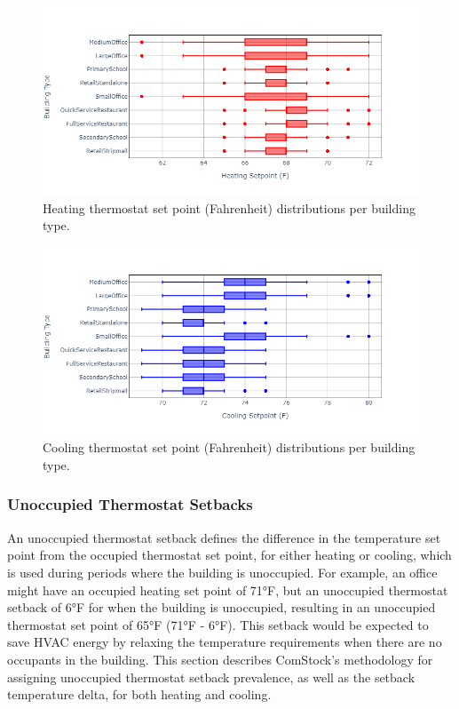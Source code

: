 

\begin{figure}
    \centering \includegraphics[width=1.0\textwidth]{figures/heating_setpoints.png}
    \caption{Heating thermostat set point (Fahrenheit) distributions per building type.}
    \label{fig:htg_therm_setpoints}
\end{figure}

\begin{figure}
    \centering \includegraphics[width=1.0\textwidth]{figures/cooling_setpoints.png}
    \caption{Cooling thermostat set point (Fahrenheit) distributions per building type.}
    \label{fig:clg_therm_setpoints}
\end{figure}

\pagebreak
\subsubsection{Unoccupied Thermostat Setbacks}

An unoccupied thermostat setback defines the difference in the temperature set point from the occupied thermostat set point, for either heating or cooling, which is used during periods where the building is unoccupied. For example, an office might have an occupied heating set point of 71°F, but an unoccupied thermostat setback of 6°F for when the building is unoccupied, resulting in an unoccupied thermostat set point of 65°F (71°F - 6°F). This setback would be expected to save HVAC energy by relaxing the temperature requirements when there are no occupants in the building. This section describes ComStock's methodology for assigning unoccupied thermostat setback prevalence, as well as the setback temperature delta, for both heating and cooling.

